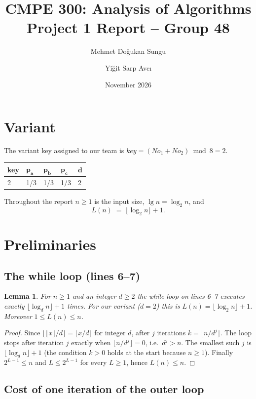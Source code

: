 \documentclass[11pt]{article}
\title{CMPE 300: Analysis of Algorithms\\[0.3em] \large Project 1 Report -- Group 48}
\author{Mehmet Do\u{g}ukan Sungu \and Yi\u{g}it Sarp Avc\i{}}
\date{November 2026}
\newcommand{\fillcell}{\rule[-0.75em]{0pt}{2.3em}}
\newcommand{\lgn}{\lfloor \log_2 n \rfloor}
\newtheorem{lemma}{Lemma}
\theoremstyle{remark}
\begin{document}
\maketitle

\section{Variant}

The variant key assigned to our team is $key = (No_1 + No_2) \bmod 8 = 2$.

\begin{center}
\begin{tabular}{|C{2.2cm}|C{2.2cm}|C{2.2cm}|C{2.2cm}|C{2.2cm}|}
\hline
\textbf{key} & $\boldsymbol{p_a}$ & $\boldsymbol{p_b}$ & $\boldsymbol{p_c}$ & $\boldsymbol{d}$ \\ \hline
\fillcell 2 & 1/3 & 1/3 & 1/3 & 2 \\ \hline
\end{tabular}
\end{center}

\noindent Throughout the report $n\ge 1$ is the input size, $\lg n=\log_2 n$, and
\[
  L(n) \;=\; \lgn + 1 .
\]

\section{Preliminaries}

\subsection{The while loop (lines 6--7)}

\begin{lemma}\label{lem:L}
For $n\ge 1$ and an integer $d\ge 2$ the while loop on lines 6--7 executes exactly
$\lfloor \log_d n\rfloor + 1$ times. For our variant ($d=2$) this is $L(n)=\lgn+1$.
Moreover $1\le L(n)\le n$.
\end{lemma}
\begin{proof}
Since $\lfloor\lfloor x\rfloor/d\rfloor=\lfloor x/d\rfloor$ for integer $d$, after $j$ iterations
$k=\lfloor n/d^j\rfloor$. The loop stops after iteration $j$ exactly when
$\lfloor n/d^j\rfloor=0$, i.e.\ $d^j>n$. The smallest such $j$ is
$\lfloor\log_d n\rfloor+1$ (the condition $k>0$ holds at the start because $n\ge1$).
Finally $2^{L-1}\le n$ and $L\le 2^{L-1}$ for every $L\ge1$, hence $L(n)\le n$.
\end{proof}

\subsection{Cost of one iteration of the outer loop}
\end{document}
